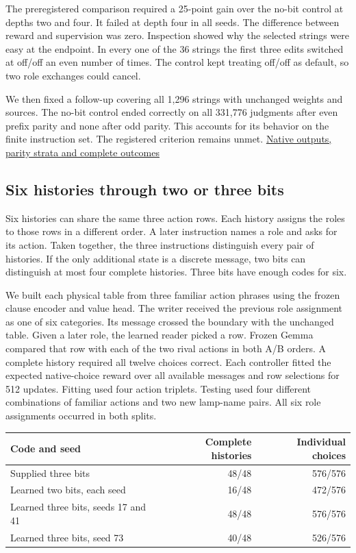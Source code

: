 \documentclass[11pt]{article}
\begin{document}
The preregistered comparison required a 25-point gain over the no-bit control at depths two and four. It failed at depth four in all seeds. The difference between reward and supervision was zero. Inspection showed why the selected strings were easy at the endpoint. In every one of the 36 strings the first three edits switched at off/off an even number of times. The control kept treating off/off as default, so two role exchanges could cancel.

We then fixed a follow-up covering all 1,296 strings with unchanged weights and sources. The no-bit control ended correctly on all 331,776 judgments after even prefix parity and none after odd parity. This accounts for its behavior on the finite instruction set. The registered criterion remains unmet. \href{https://github.com/RyoSpiralArchitect/self-fold/blob/v1.0.0/provenance/role_memory_20261104/RESULTS.md}{Native outputs, parity strata and complete outcomes}

\subsection{Six histories through two or three bits}

Six histories can share the same three action rows. Each history assigns the roles to those rows in a different order. A later instruction names a role and asks for its action. Taken together, the three instructions distinguish every pair of histories. If the only additional state is a discrete message, two bits can distinguish at most four complete histories. Three bits have enough codes for six.

We built each physical table from three familiar action phrases using the frozen clause encoder and value head. The writer received the previous role assignment as one of six categories. Its message crossed the boundary with the unchanged table. Given a later role, the learned reader picked a row. Frozen Gemma compared that row with each of the two rival actions in both A/B orders. A complete history required all twelve choices correct. Each controller fitted the expected native-choice reward over all available messages and row selections for 512 updates. Fitting used four action triplets. Testing used four different combinations of familiar actions and two new lamp-name pairs. All six role assignments occurred in both splits.

\begin{center}
\small\renewcommand{\arraystretch}{1.13}
\begin{tabular}{@{}lrr@{}}
\toprule
Code and seed & Complete histories & Individual choices \\
\midrule
Supplied three bits & 48/48 & 576/576 \\
Learned two bits, each seed & 16/48 & 472/576 \\
Learned three bits, seeds 17 and 41 & 48/48 & 576/576 \\
Learned three bits, seed 73 & 40/48 & 526/576 \\
\bottomrule
\end{tabular}
\end{center}
\end{document}

